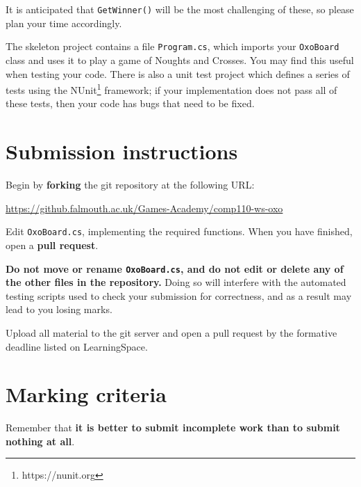\documentclass{../../../fal_assignment}
\begin{document}
It is anticipated that \lstinline{GetWinner()} will be the most challenging of these,
so please plan your time accordingly.

The skeleton project contains a file \texttt{Program.cs}, which imports your \lstinline{OxoBoard} class
and uses it to play a game of Noughts and Crosses. You may find this useful when testing your code.
There is also a unit test project which defines a series of tests using the NUnit\footnote{https://nunit.org} framework;
if your implementation does not pass all of these tests, then your code has bugs that need to be fixed.

\section*{Submission instructions}

Begin by \textbf{forking} the git repository at the following URL:

\url{https://github.falmouth.ac.uk/Games-Academy/comp110-ws-oxo}

Edit \texttt{OxoBoard.cs}, implementing the required functions.
When you have finished, open a \textbf{pull request}.

\textbf{Do not move or rename \texttt{OxoBoard.cs}, and do not edit or delete any of the other files in the repository.}
Doing so will interfere with the automated testing scripts used to check your submission for correctness,
and as a result may lead to you losing marks.

Upload all material to the git server and open a pull request by the formative deadline listed on LearningSpace.

\section*{Marking criteria}

Remember that \textbf{it is better to submit incomplete work than to submit nothing at all}.
\end{document}
